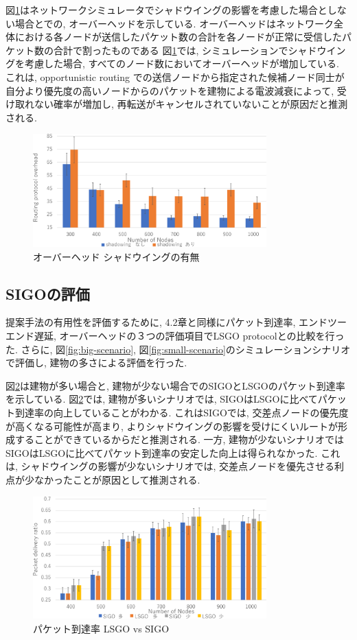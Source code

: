 \documentclass[technicalreport]{ieicej}
\begin{document}
図\ref{fig:Overhead-shadowing}はネットワークシミュレータでシャドウイングの影響を考慮した場合としない場合とでの, オーバーヘッドを示している. オーバーヘッドはネットワーク全体における各ノードが送信したパケット数の合計を各ノードが正常に受信したパケット数の合計で割ったものである 図\ref{fig:Overhead-shadowing}では, シミュレーションでシャドウイングを考慮した場合, すべてのノード数においてオーバーヘッドが増加している. これは, opportunistic routing での送信ノードから指定された候補ノード同士が自分より優先度の高いノードからのパケットを建物による電波減衰によって, 受け取れない確率が増加し, 再転送がキャンセルされていないことが原因だと推測される. 


\begin{figure}[!ht]
\centering
\includegraphics[width=90mm]{figures/Overhead-shadowing.eps}
\caption{オーバーヘッド シャドウイングの有無}
\label{fig:Overhead-shadowing}
\end{figure}


\subsection{SIGOの評価}
提案手法の有用性を評価するために, 4.2章と同様にパケット到達率, エンドツーエンド遅延, オーバーヘッドの３つの評価項目でLSGO protocolとの比較を行った. さらに, 図\ref{fig:big-scenario}, 図\ref{fig:small-scenario}のシミュレーションシナリオで評価し, 建物の多さによる評価を行った. 

図\ref{fig:PDR}は建物が多い場合と, 建物が少ない場合でのSIGOとLSGOのパケット到達率を示している. 図\ref{fig:PDR}では, 建物が多いシナリオでは, SIGOはLSGOに比べてパケット到達率の向上していることがわかる. これはSIGOでは, 交差点ノードの優先度が高くなる可能性が高まり, よりシャドウイングの影響を受けにくいルートが形成することができているからだと推測される. 
一方, 建物が少ないシナリオではSIGOはLSGOに比べてパケット到達率の安定した向上は得られなかった. これは, シャドウイングの影響が少ないシナリオでは, 交差点ノードを優先させる利点が少なかったことが原因として推測される. 

\begin{figure}[!ht]
\centering
\includegraphics[width=90mm]{figures/PDR.eps}
\caption{パケット到達率 LSGO vs SIGO}
\label{fig:PDR}
\end{figure}
\end{document}
